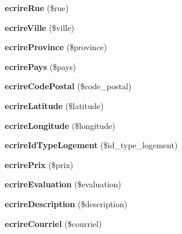 \begin{DoxyCompactItemize}
{\bfseries ecrire\+Rue} (\$rue)
\item 
\mbox{\label{class_logement_a7ac5d15df956c09f7363c514b522839e}} 
{\bfseries ecrire\+Ville} (\$ville)
\item 
\mbox{\label{class_logement_a55d56f443e51bf716de76a3d27f50090}} 
{\bfseries ecrire\+Province} (\$province)
\item 
\mbox{\label{class_logement_a97567e871b558c932d9d01fc9259a65c}} 
{\bfseries ecrire\+Pays} (\$pays)
\item 
\mbox{\label{class_logement_aa1ae84a0864d1cea125f6daab318c27e}} 
{\bfseries ecrire\+Code\+Postal} (\$code\+\_\+postal)
\item 
\mbox{\label{class_logement_a7b049a418b19b4a99df49142a9e0dadd}} 
{\bfseries ecrire\+Latitude} (\$latitude)
\item 
\mbox{\label{class_logement_ab5eb6cbb4f92cdf80686f5894d05175b}} 
{\bfseries ecrire\+Longitude} (\$longitude)
\item 
\mbox{\label{class_logement_ab10052f0190b3bbdaded4473ca07ffdd}} 
{\bfseries ecrire\+Id\+Type\+Logement} (\$id\+\_\+type\+\_\+logement)
\item 
\mbox{\label{class_logement_a73948ffa973a462193fb6616655d0d2b}} 
{\bfseries ecrire\+Prix} (\$prix)
\item 
\mbox{\label{class_logement_a5635d56f8b43fe616c12801079abff5b}} 
{\bfseries ecrire\+Evaluation} (\$evaluation)
\item 
\mbox{\label{class_logement_aa2355368ee3dafed4dc225a8505ef728}} 
{\bfseries ecrire\+Description} (\$description)
\item 
\mbox{\label{class_logement_a39fb0d314a980fe04e906aee1e8e0a80}} 
{\bfseries ecrire\+Courriel} (\$courriel)
\item 
\mbox{\label{class_logement_a99b25743c1f47ab7cbbc8b36f88a5ca4}} 

\end{DoxyCompactItemize}
